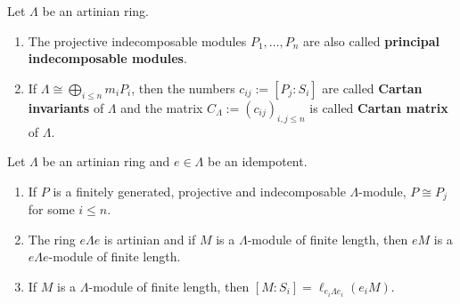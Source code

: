 
\begin{definition}
Let $\Lambda$ be an artinian ring.
\begin{enumerate}
\item The projective indecomposable modules $P_1,\dots,P_n$ are also called \textbf{principal indecomposable modules}.
\item If $\Lambda\cong\bigoplus_{i\le n} m_i P_i$, then the numbers $c_{ij} := [P_j:S_i]$ are called \textbf{Cartan invariants} of $\Lambda$ and the matrix $C_\Lambda:=(c_{ij})_{i,j\le n}$ is called \textbf{Cartan matrix} of $\Lambda$.
\end{enumerate}
\end{definition}


\begin{lemma}\label{1.4.7}
Let $\Lambda$ be an artinian ring and $e\in\Lambda$ be an idempotent.
\begin{enumerate}
\item If $P$ is a finitely generated, projective and indecomposable $\Lambda$-module, $P\cong P_j$ for some $i\le n$.
\item The ring $e\Lambda e$ is artinian and if $M$ is a $\Lambda$-module of finite length, then $eM$ is a $e\Lambda e$-module of finite length.
\item If $M$ is a $\Lambda$-module of finite length, then $[M:S_i]=\ell_{e_i \Lambda e_i}(e_i M)$.
\end{enumerate}
\end{lemma}


